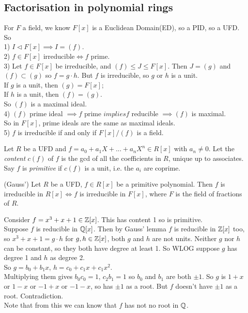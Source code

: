 \documentclass[a4paper]{article}
\begin{document}
\subsection{Factorisation in polynomial rings}
For $F$ a field, we know $F[x]$ is a Euclidean Domain(ED), so a PID, so a UFD. So\\
1) $I\triangleleft F[x] \implies I=\left(f\right)$.\\
2) $f\in F[x]\text{ irreducible} \iff f\text{ prime}$.\\
3) Let $f\in F[x]$ be irreducible, and $\left(f\right) \leq J \leq F[x]$. Then $J=\left(g\right)$ and $\left(f\right) \subset \left(g\right)$ so $f=g\cdot h$. But $f$ is irreducible, so $g$ or $h$ is a unit.\\
If $g$ is a unit, then $\left(g\right)=F[x]$;\\
If $h$ is a unit, then $\left(f\right)=\left(g\right)$.\\
So $\left(f\right)$ is a maximal ideal.\\
4) $\left(f\right)$ prime ideal $\implies f$ prime $implies f$ reducible $\implies \left(f\right)$ is maximal.\\
So in $F[x]$, prime ideals are the same as maximal ideals.\\
5) $f$ is irreducible if and only if $F[x]/\left(f\right)$ is a field.\\

\begin{defi}
Let $R$ be a UFD and $f=a_0+a_1 X+...+a_n X^n \in R[x]$ with $a_n \neq 0$. Let the \emph{content} $c\left(f\right)$ of $f$ is the gcd of all the coefficients in $R$, unique up to associates. Say $f$ is \emph{primitive} if $c\left(f\right)$ is a unit, i.e. the $a_i$ are coprime.
\end{defi}

\begin{lemma} (Gauss')
Let $R$ be a UFD, $f\in R[x]$ be a primitive polynomial. Then $f$ is irreducible in $R[x] \iff f$ is irreducible in $F[x]$, where $F$ is the field of fractions of $R$.
\end{lemma}

\begin{eg}
Consider $f=x^3+x+1 \in \mathbb{Z}[x]$. This has content 1 so is primitive.\\
Suppose $f$ is reducible in $\mathbb{Q}[x]$. Then by Gauss' lemma $f$ is reducible in $\mathbb{Z}[x]$ too, so $x^3+x+1=g\cdot h$ for $g,h\in \mathbb{Z}[x]$, both $g$ and $h$ are not units. Neither $g$ nor $h$ can be constant, so they both have degree at least 1. So WLOG suppose $g$ has degree 1 and $h$ as degree 2.\\
So $g=b_0+b_1x$, $h=c_0+c_1x+c_1x^2$.\\
Multiplying them gives $b_0c_0=1$, $c_2b_1=1$ so $b_0$ and $b_1$ are both $\pm 1$. So $g$ is $1+x$ or $1-x$ or $-1+x$ or $-1-x$, so has $\pm 1$ as a root. But $f$ doesn't have $\pm 1$ as a root. Contradiction.\\
Note that from this we can know that $f$ has not no root in $\mathbb{Q}$.
\end{eg}
\end{document}
